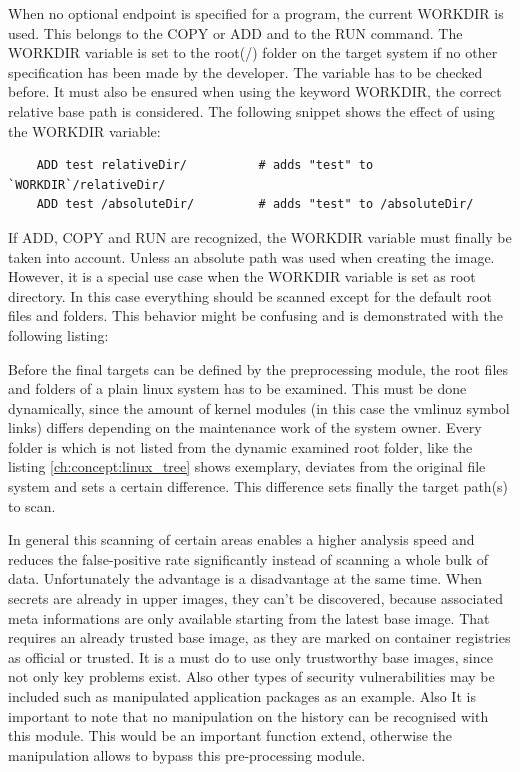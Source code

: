 When no optional endpoint is specified for a program, the current WORKDIR is used. This belongs to the COPY or ADD and to the RUN command.
The WORKDIR variable is set to the root(/) folder on the target system if no other specification has been made by the developer. The variable has to be checked before. 
It must also be ensured when using the keyword WORKDIR, the correct relative base path is considered. 
The following snippet shows the effect of using the WORKDIR variable:
\begin{lstlisting}
	ADD test relativeDir/          # adds "test" to `WORKDIR`/relativeDir/
	ADD test /absoluteDir/         # adds "test" to /absoluteDir/
\end{lstlisting}
If ADD, COPY and RUN are recognized, the WORKDIR variable must finally be taken into account. Unless an absolute path was used when creating the image.
However, it is a special use case when the WORKDIR variable is set as root directory. In this case everything should be scanned except for the default root files and folders.
This behavior might be confusing and is demonstrated with the following listing:

Before the final targets can be defined by the preprocessing module, the root files and folders of a plain linux system has to be examined. This must be done dynamically, since the amount of kernel modules (in this case the vmlinuz symbol links) differs depending on the maintenance work of the system owner. Every folder is which is not listed from the dynamic examined root folder, like the listing \ref{ch:concept:linux_tree} shows exemplary, deviates from the original file system and sets a certain difference. This difference sets finally the target path(s) to scan. 

In general this scanning of certain areas enables a higher analysis speed and reduces the false-positive rate significantly instead of scanning a whole bulk of data. Unfortunately the advantage is a disadvantage at the same time. When secrets are already in upper images, they can't be discovered, because associated meta informations are only available starting from the latest base image. That requires an already trusted base image, as they are marked on container registries as official or trusted. It is a must do to use only trustworthy base images, since not only key problems exist. Also other types of security vulnerabilities may be included such as manipulated application packages as an example. 
Also It is important to note that no manipulation on the history can be recognised with this module. This would be an important function extend, otherwise the manipulation allows to bypass this pre-processing module. 

